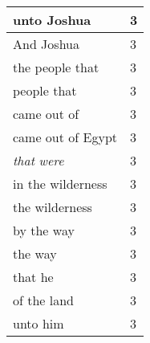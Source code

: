\begin{center}
\begin{longtable}{|p{3.0in}|p{0.5in}|}
unto Joshua & 3\\ \hline 
And Joshua & 3\\ \hline 
the people that & 3\\ \hline 
people that & 3\\ \hline 
came out of & 3\\ \hline 
came out of Egypt & 3\\ \hline 
\emph{that} \emph{were} & 3\\ \hline 
in the wilderness & 3\\ \hline 
the wilderness & 3\\ \hline 
by the way & 3\\ \hline 
the way & 3\\ \hline 
that he & 3\\ \hline 
of the land & 3\\ \hline 
unto him & 3\\ \hline 
\end{longtable}
\end{center}





